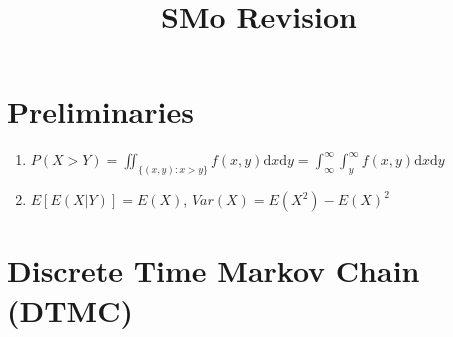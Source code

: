 \documentclass[11pt,a4paper]{article}
\title{SMo Revision}
\begin{document}
\section*{Preliminaries}

\begin{enumerate}
\item $P(X>Y) = \iint_{\{(x,y): x>y\}} f(x,y) \mathrm{d}x \mathrm{d}y = \int_{\infty}^{\infty} \int_y^{\infty} f(x,y) \mathrm{d}x \mathrm{d}y$

\item $E[E(X|Y)]=E(X)$, $Var(X) = E(X^2) - E(X)^2$
\end{enumerate}

\section*{Discrete Time Markov Chain (DTMC)}
\end{document}
